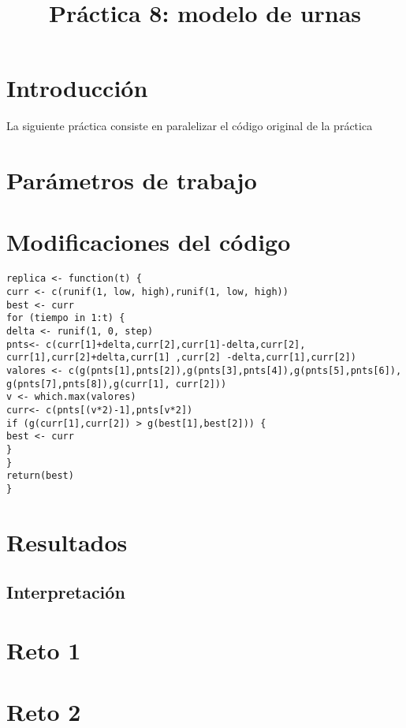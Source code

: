 \documentclass[a4paper]{article}
\title{Práctica 8: modelo de urnas}
\begin{document}
\maketitle

\section{Introducci\'on}
La siguiente práctica consiste en paralelizar el código original de la práctica

\section{Par\'ametros de trabajo}


\section{Modificaciones del código}

\begin{lstlisting}[frame=single]
replica <- function(t) {
curr <- c(runif(1, low, high),runif(1, low, high))
best <- curr
for (tiempo in 1:t) {
delta <- runif(1, 0, step)
pnts<- c(curr[1]+delta,curr[2],curr[1]-delta,curr[2],
curr[1],curr[2]+delta,curr[1] ,curr[2] -delta,curr[1],curr[2])
valores <- c(g(pnts[1],pnts[2]),g(pnts[3],pnts[4]),g(pnts[5],pnts[6]),
g(pnts[7],pnts[8]),g(curr[1], curr[2]))
v <- which.max(valores)
curr<- c(pnts[(v*2)-1],pnts[v*2])
if (g(curr[1],curr[2]) > g(best[1],best[2])) {
best <- curr
}
}
return(best)
} 
\end{lstlisting}


\section{Resultados}

\subsection{Interpretación}

 
\section{Reto 1}


\section{Reto 2}
\end{document}
